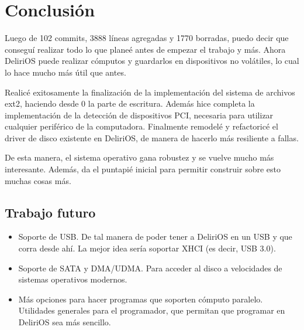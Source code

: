 \chapter*{Conclusión}

Luego de 102 commits, 3888 líneas agregadas y 1770 borradas, puedo decir que conseguí realizar todo lo que planeé antes de empezar el trabajo y más. Ahora DeliriOS puede realizar cómputos y guardarlos en dispositivos no volátiles, lo cual lo hace mucho más útil que antes.

Realicé exitosamente la finalización de la implementación del sistema de archivos ext2, haciendo desde 0 la parte de escritura. Además hice completa la implementación de la detección de dispositivos PCI, necesaria para utilizar cualquier periférico de la computadora. Finalmente remodelé y refactoricé el driver de disco existente en DeliriOS, de manera de hacerlo más resiliente a fallas.

De esta manera, el sistema operativo gana robustez y se vuelve mucho más interesante. Además, da el puntapié inicial para permitir construir sobre esto muchas cosas más.

\section*{Trabajo futuro}

\begin{itemize}
  \item Soporte de USB. De tal manera de poder tener a DeliriOS en un USB y que corra desde ahí. La mejor idea sería soportar XHCI (es decir, USB 3.0).
  \item Soporte de SATA y DMA/UDMA. Para acceder al disco a velocidades de sistemas operativos modernos.
  \item Más opciones para hacer programas que soporten cómputo paralelo. Utilidades generales para el programador, que permitan que programar en DeliriOS sea más sencillo.
\end{itemize}

